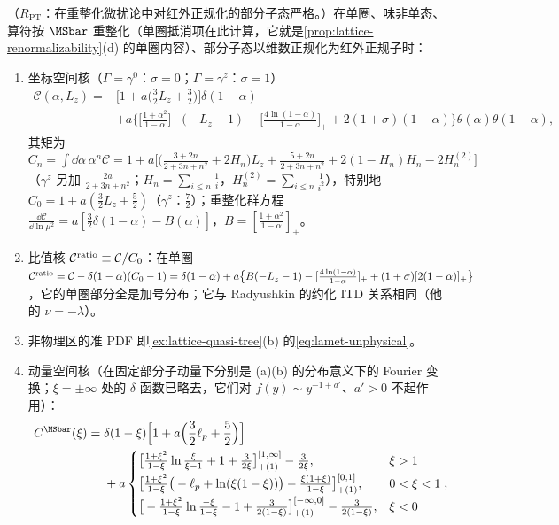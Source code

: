 \begin{proposition}\label{prop:lamet-oneloop}
（$R_{\mathrm{PT}}$：在重整化微扰论中对红外正规化的部分子态严格。）在单圈、味非单态、算符按 $\MSbar$ 重整化（单圈抵消项在此计算，它就是\cref{prop:lattice-renormalizability}(d) 的单圈内容）、部分子态以维数正规化为红外正规子时：
\begin{enumerate}[label=(\alph*),leftmargin=2em,itemsep=2pt,topsep=2pt]
\item 坐标空间核（$\Gamma=\gamma^0$：$\sigma=0$；$\Gamma=\gamma^z$：$\sigma=1$）
\begin{equation}\label{eq:lamet-coord-kernel}
\begin{split}
\mathcal C(\alpha,L_z)={}&\Big[1+a\Big(\frac32L_z+\frac32\Big)\Big]\delta(1-\alpha)\\
&+a\Big\{\Big[\frac{1+\alpha^2}{1-\alpha}\Big]_+(-L_z-1)-\Big[\frac{4\ln(1-\alpha)}{1-\alpha}\Big]_++2(1+\sigma)(1-\alpha)\Big\}\theta(\alpha)\theta(1-\alpha),
\end{split}
\end{equation}%
其矩为 $C_n=\int\dd\alpha\,\alpha^n\mathcal C=1+a\big[\big(\frac{3+2n}{2+3n+n^2}+2H_n\big)L_z+\frac{5+2n}{2+3n+n^2}+2(1-H_n)H_n-2H^{(2)}_n\big]$（$\gamma^z$ 另加 $\frac{2a}{2+3n+n^2}$；$H_n=\sum_{i\le n}\frac1i$，$H^{(2)}_n=\sum_{i\le n}\frac1{i^2}$），特别地 $C_0=1+a(\frac32L_z+\frac52)$（$\gamma^z$：$\frac72$）；重整化群方程 $\frac{\dd\mathcal C}{\dd\ln\mu^2}=a[\frac32\delta(1-\alpha)-B(\alpha)]$，$B=[\frac{1+\alpha^2}{1-\alpha}]_+$。
\item 比值核 $\mathcal C^{\rm ratio}\equiv\mathcal C/C_0$：在单圈 $\mathcal C^{\rm ratio}=\mathcal C-\delta(1-\alpha)(C_0-1)=\delta(1-\alpha)+a\big\{B(-L_z-1)-[\frac{4\ln(1-\alpha)}{1-\alpha}]_++(1+\sigma)[2(1-\alpha)]_+\big\}$，它的单圈部分全是加号分布；它与 Radyushkin 的约化 ITD 关系相同（他的 $\nu=-\lambda$）。%
\item 非物理区的准 PDF 即\cref{ex:lattice-quasi-tree}(b) 的\cref{eq:lamet-unphysical}。
\item 动量空间核（在固定部分子动量下分别是 (a)(b) 的分布意义下的 Fourier 变换；$\xi=\pm\infty$ 处的 $\delta$ 函数已略去，它们对 $f(y)\sim y^{-1+a'}$、$a'>0$ 不起作用）：
\begin{equation}\label{eq:lamet-CMS}
\begin{split}
C^{\MSbar}(\xi)={}&\delta(1-\xi)\Big[1+a\Big(\frac32\ell_p+\frac52\Big)\Big]\\
&+a\begin{cases}\big[\frac{1+\xi^2}{1-\xi}\ln\frac\xi{\xi-1}+1+\frac3{2\xi}\big]^{[1,\infty]}_{+(1)}-\frac3{2\xi},&\xi>1\\[3pt]\big[\frac{1+\xi^2}{1-\xi}\big(-\ell_p+\ln(\xi(1-\xi))\big)-\frac{\xi(1+\xi)}{1-\xi}\big]^{[0,1]}_{+(1)},&0<\xi<1\\[3pt]\big[-\frac{1+\xi^2}{1-\xi}\ln\frac{-\xi}{1-\xi}-1+\frac3{2(1-\xi)}\big]^{[-\infty,0]}_{+(1)}-\frac3{2(1-\xi)},&\xi<0\end{cases},

\end{split}
\end{equation}
\end{enumerate}
\end{proposition}
